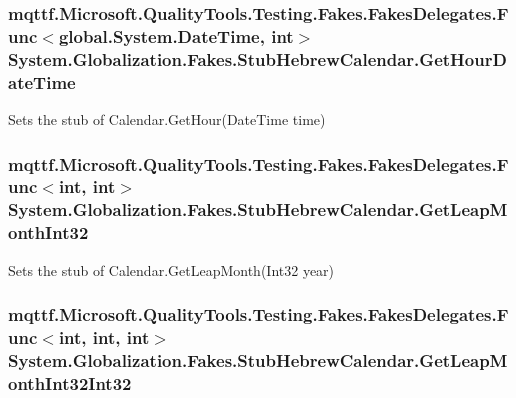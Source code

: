 \hypertarget{class_system_1_1_globalization_1_1_fakes_1_1_stub_hebrew_calendar_a9b45d72e29284166528320a6f3475f2f}{
\subsubsection[{Get\-Hour\-Date\-Time}]{\setlength{\rightskip}{0pt plus 5cm}mqttf.\-Microsoft.\-Quality\-Tools.\-Testing.\-Fakes.\-Fakes\-Delegates.\-Func$<$global.\-System.\-Date\-Time, int$>$ System.\-Globalization.\-Fakes.\-Stub\-Hebrew\-Calendar.\-Get\-Hour\-Date\-Time}}\label{class_system_1_1_globalization_1_1_fakes_1_1_stub_hebrew_calendar_a9b45d72e29284166528320a6f3475f2f}


Sets the stub of Calendar.\-Get\-Hour(\-Date\-Time time)

\hypertarget{class_system_1_1_globalization_1_1_fakes_1_1_stub_hebrew_calendar_a54bf85b8a63bd7844f15c5efe48256ba}{
\subsubsection[{Get\-Leap\-Month\-Int32}]{\setlength{\rightskip}{0pt plus 5cm}mqttf.\-Microsoft.\-Quality\-Tools.\-Testing.\-Fakes.\-Fakes\-Delegates.\-Func$<$int, int$>$ System.\-Globalization.\-Fakes.\-Stub\-Hebrew\-Calendar.\-Get\-Leap\-Month\-Int32}}\label{class_system_1_1_globalization_1_1_fakes_1_1_stub_hebrew_calendar_a54bf85b8a63bd7844f15c5efe48256ba}


Sets the stub of Calendar.\-Get\-Leap\-Month(\-Int32 year)

\hypertarget{class_system_1_1_globalization_1_1_fakes_1_1_stub_hebrew_calendar_af9849b4943cdb95c1e711bd0954ef500}{
\subsubsection[{Get\-Leap\-Month\-Int32\-Int32}]{\setlength{\rightskip}{0pt plus 5cm}mqttf.\-Microsoft.\-Quality\-Tools.\-Testing.\-Fakes.\-Fakes\-Delegates.\-Func$<$int, int, int$>$ System.\-Globalization.\-Fakes.\-Stub\-Hebrew\-Calendar.\-Get\-Leap\-Month\-Int32\-Int32}}\label{class_system_1_1_globalization_1_1_fakes_1_1_stub_hebrew_calendar_af9849b4943cdb95c1e711bd0954ef500}


